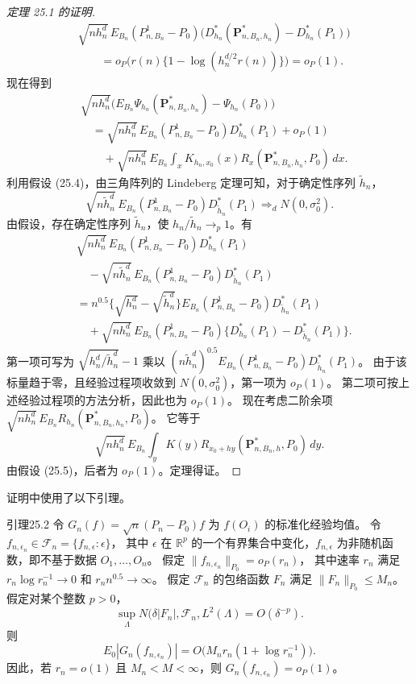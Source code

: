 \begin{proof}[定理 25.1 的证明]
\[
\begin{aligned}
 &\sqrt{nh_n^d}\,E_{B_n}(P^1_{n,B_n}-P_0)
 \bigl(D_{h_n}^*(\mathbf P^*_{n,B_n,h_n})-D_{h_n}^*(P_1)\bigr)\\
 &\qquad=o_P\bigl(r(n)\{1-\log(h_n^{d/2}r(n))\}\bigr)=o_P(1).
\end{aligned}
\]
现在得到
\[
\begin{aligned}
 &\sqrt{nh_n^d}\bigl(
 E_{B_n}\Psi_{h_n}(\mathbf P^*_{n,B_n,h_n})-\Psi_{h_n}(P_0)\bigr)\\
 &\quad=\sqrt{nh_n^d}\,E_{B_n}(P^1_{n,B_n}-P_0)D_{h_n}^*(P_1)+o_P(1)\\
 &\qquad+\sqrt{nh_n^d}\,E_{B_n}\int_x K_{h_n,x_0}(x)
 R_x(\mathbf P^*_{n,B_n,h_n},P_0)\,dx.
\end{aligned}
\]
利用假设 (25.4)，由三角阵列的 Lindeberg 定理可知，对于确定性序列 $\tilde h_n$，
\[
 \sqrt{n\tilde h_n^d}\,E_{B_n}(P^1_{n,B_n}-P_0)
 D_{\tilde h_n}^*(P_1)\Rightarrow_dN(0,\sigma_0^2).
\]
由假设，存在确定性序列 $\tilde h_n$，使 $h_n/\tilde h_n\to_p1$。有
\[
\begin{aligned}
 &\sqrt{nh_n^d}\,E_{B_n}(P^1_{n,B_n}-P_0)D_{h_n}^*(P_1)\\
 &\quad-\sqrt{n\tilde h_n^d}\,E_{B_n}(P^1_{n,B_n}-P_0)
 D_{\tilde h_n}^*(P_1)\\
 &=n^{0.5}\{\sqrt{h_n^d}-\sqrt{\tilde h_n^d}\}
 E_{B_n}(P^1_{n,B_n}-P_0)D_{\tilde h_n}^*(P_1)\\
 &\quad+\sqrt{nh_n^d}\,E_{B_n}(P^1_{n,B_n}-P_0)
 \{D_{h_n}^*(P_1)-D_{\tilde h_n}^*(P_1)\}.
\end{aligned}
\]
第一项可写为 $\sqrt{h_n^d/\tilde h_n^d}-1$ 乘以
$(n\tilde h_n^d)^{0.5}E_{B_n}(P^1_{n,B_n}-P_0)D_{\tilde h_n}^*(P_1)$。
由于该标量趋于零，且经验过程项收敛到 $N(0,\sigma_0^2)$，第一项为 $o_P(1)$。
第二项可按上述经验过程项的方法分析，因此也为 $o_P(1)$。
现在考虑二阶余项
$\sqrt{nh_n^d}\,E_{B_n}R_{h_n}(\mathbf P^*_{n,B_n,h_n},P_0)$。
它等于
\[
 \sqrt{nh_n^d}\,E_{B_n}\int_y K(y)
 R_{x_0+hy}(\mathbf P^*_{n,B_n,h},P_0)\,dy.
\]
由假设 (25.5)，后者为 $o_P(1)$。定理得证。
\end{proof}

证明中使用了以下引理。

\begin{bookresult}{引理}{25.2}
令 $G_n(f)=\sqrt n(P_n-P_0)f$ 为 $f(O_i)$ 的标准化经验均值。
令 $f_{n,\epsilon_n}\in\mathcal F_n=\{f_{n,\epsilon}:\epsilon\}$，
其中 $\epsilon$ 在 $\mathbb R^p$ 的一个有界集合中变化，$f_{n,\epsilon}$ 为非随机函数，即不基于数据 $O_1,\ldots,O_n$。
假定 $\|f_{n,\epsilon_n}\|_{P_0}=o_P(r_n)$，
其中速率 $r_n$ 满足 $r_n\log r_n^{-1}\to0$ 和 $r_nn^{0.5}\to\infty$。
假定 $\mathcal F_n$ 的包络函数 $F_n$ 满足 $\|F_n\|_{P_0}\leq M_n$。
假定对某个整数 $p>0$，
\[
 \sup_\Lambda N(\delta|F_n|,\mathcal F_n,L^2(\Lambda)=O(\delta^{-p}).
\]
则
\[
 E_0|G_n(f_{n,\epsilon_n})|
 =O\bigl(M_nr_n(1+\log r_n^{-1})\bigr).
\]
因此，若 $r_n=o(1)$ 且 $M_n<M<\infty$，则
$G_n(f_{n,\epsilon_n})=o_P(1)$。
\end{bookresult}

